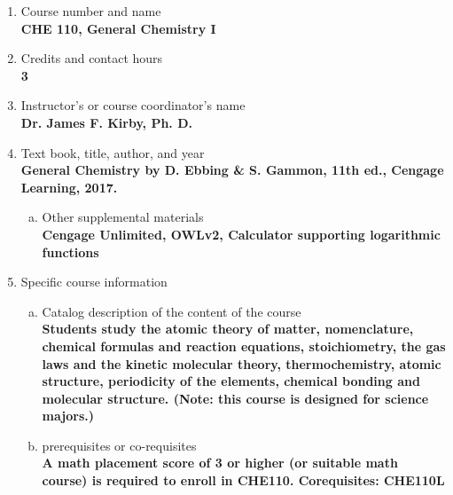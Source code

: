 \label{CHE110}  %
\begin{enumerate}[1.]
\item Course number and name\\
  {\bfseries
CHE 110, General Chemistry I
  }

\item Credits and contact hours\\
  {\bfseries
3
  }

\item Instructor's or course coordinator's name\\
  {\bfseries
    Dr. James F. Kirby, Ph. D.
  }

\item Text book, title, author, and year\\
  {\bfseries
    General Chemistry by D. Ebbing \& S. Gammon, 11th ed., Cengage Learning, 2017.
  }
\begin{enumerate}[a.]
\item Other supplemental materials\\
  {\bfseries
    Cengage Unlimited, OWLv2, Calculator supporting logarithmic functions
  }
\end{enumerate}

\item Specific course information
\begin{enumerate}[a.]
\item Catalog description of the content of the course\\
  {\bfseries
Students study the atomic theory of matter, nomenclature, chemical formulas and reaction equations, stoichiometry, the gas laws and the kinetic molecular theory, thermochemistry, atomic structure, periodicity of the elements, chemical bonding and molecular structure. (Note: this course is designed for science majors.)
  }

\item prerequisites or co-requisites\\
  {\bfseries
    A math placement score of 3 or higher (or suitable math course) is required to enroll in CHE110. Corequisites: CHE110L
  }


\end{enumerate}
\end{enumerate}
